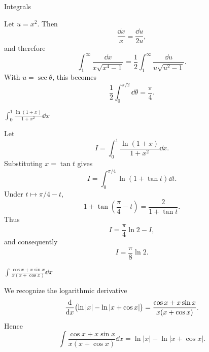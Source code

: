 \begin{expectedproblemgroup}{Integrals}
        \begin{expectedsubsolution}
            Let $u=x^2$. Then
            \[
                \frac{\dd x}{x}=\frac{\dd u}{2u},
            \]
            and therefore
            \[
                \int_1^\infty\frac{\dd x}{x\sqrt{x^4-1}}
                =
                \frac{1}{2}
                \int_1^\infty\frac{\dd u}{u\sqrt{u^2-1}}.
            \]
            With $u=\sec\theta$, this becomes
            \[
                \frac{1}{2}\int_0^{\pi/2}\dd\theta
                =
                \boxed{\frac{\pi}{4}}.
            \]
        \end{expectedsubsolution}

        \begin{expectedsubproblem}
            \(\displaystyle
                \int_0^1\frac{\ln(1+x)}{1+x^2}\dd x
            \)
        \end{expectedsubproblem}

        \begin{expectedsubsolution}
            Let
            \[
                I=\int_0^1\frac{\ln(1+x)}{1+x^2}\dd x.
            \]
            Substituting $x=\tan t$ gives
            \[
                I=\int_0^{\pi/4}\ln(1+\tan t)\dd t.
            \]
            Under $t\mapsto\pi/4-t$,
            \[
                1+\tan\left(\frac{\pi}{4}-t\right)
                =
                \frac{2}{1+\tan t}.
            \]
            Thus
            \[
                I=\frac{\pi}{4}\ln2-I,
            \]
            and consequently
            \[
                \boxed{I=\frac{\pi}{8}\ln2}.
            \]
        \end{expectedsubsolution}

        \begin{expectedsubproblem}
            \(\displaystyle
                \int\frac{\cos x+x\sin x}{x(x+\cos x)}\dd x
            \)
        \end{expectedsubproblem}

        \begin{expectedsubsolution}
            We recognize the logarithmic derivative
            \[
                \frac{\mathop{}\!\mathrm{d} }{\mathop{}\!\mathrm{d} x}
                \bigl(\ln|x|-\ln|x+\cos x|\bigr)
                =
                \frac{\cos x+x\sin x}{x(x+\cos x)}.
            \]
            Hence
            \[
                \boxed{
                    \int\frac{\cos x+x\sin x}{x(x+\cos x)}\dd x
                    =
                    \ln|x|-\ln|x+\cos x|
                }.
            \]
        \end{expectedsubsolution}


\end{expectedproblemgroup}
